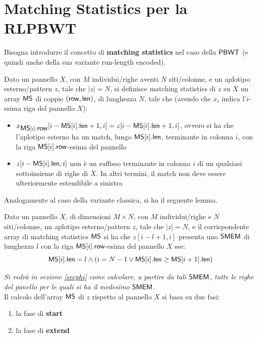 \section{Matching Statistics per la RLPBWT}
Bisogna introdurre il 
concetto di \textbf{matching statistics} nel caso della $\mbox{\rm {\sf PBWT}}$ (e quindi
anche della sua variante run-length encoded).
\begin{definizione}
  Dato un pannello $X$, con $M$ individui/righe aventi $N$ siti/colonne,
  e un aplotipo esterno/pattern $z$, tale che $|z|=N$, si definisce matching
  statistics di $z$ su $X$ un array $\mbox{\rm {\sf MS}}$ di coppie $(\mbox{\rm {\sf row}},\mbox{\rm {\sf len}})$, di lunghezza
  $N$, tale che (avendo che $x_i$ indica l'$i$-esima riga del pannello $X$): 
  \begin{itemize}
    \item $x_{\mbox{\rm {\sf MS}}[i].\mbox{\rm {\sf row}}}[i-\mbox{\rm {\sf MS}}[i].\mbox{\rm {\sf len}}+1,i]=z[i-\mbox{\rm {\sf MS}}[i].\mbox{\rm {\sf len}}+1,i]$, ovvero si
    ha che 
    l'aplotipo esterno ha un match, lungo $\mbox{\rm {\sf MS}}[i].\mbox{\rm {\sf len}}$, terminante in colonna
    $i$, con la riga 
    $\mbox{\rm {\sf MS}}[i].\mbox{\rm {\sf row}}$-esima del pannello
    \item $z[i-\mbox{\rm {\sf MS}}[i].\mbox{\rm {\sf len}},i]$ non è un suffisso terminante in colonna $i$ di un
    qualsiasi sottoinsieme di righe di $X$. In altri termini, il match non deve
    essere ulteriormente estendibile a sinistra
  \end{itemize}
\end{definizione}
\noindent
Analogamente al caso della variante classica, si ha il seguente lemma.
\begin{lemma}
  Dato un pannello $X$, di dimensioni $M\times N$, con $M$ individui/righe e $N$
  siti/colonne, un aplotipo esterno/pattern $z$, tale che $|z|=N$, e il
  corrispondente 
  array di matching statistics $\mbox{\rm {\sf MS}}$ si ha che $z[i-l+1,i]$
  presenta uno $\mbox{\rm {\sf SMEM}}$ di lunghezza $l$ con la riga $\mbox{\rm {\sf MS}}[i].\mbox{\rm {\sf row}}$-esima del
  pannello $X$ sse: 
  \begin{equation}
    \label{eq:rlpbwtsmem}
    \mbox{\rm {\sf MS}}[i].\mbox{\rm {\sf len}}=l\land(i=N-1\lor \mbox{\rm {\sf MS}}[i].\mbox{\rm {\sf len}}\geq \mbox{\rm {\sf MS}}[i+1].\mbox{\rm {\sf len}})
  \end{equation}
\end{lemma}
\noindent
\textit{Si vedrà in sezione \ref{secphi} come calcolare, a partire da tali
  $\mbox{\rm {\sf SMEM}}$, tutte le righe del panello per le quali si ha il medesimo
  $\mbox{\rm {\sf SMEM}}$}.\\
Il calcolo dell'array $\mbox{\rm {\sf MS}}$ di $z$ rispetto al pannello $X$ si basa su due fasi:
\begin{enumerate}
  \item la fase di \textbf{start}
  \item la fase di \textbf{extend}
\end{enumerate}
